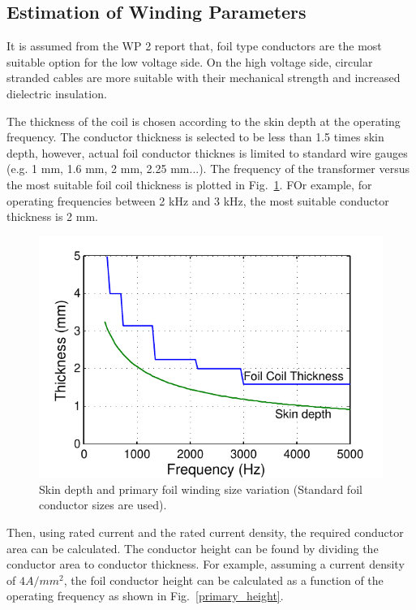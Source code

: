 \documentclass[a4paper, 11pt]{article} %
\begin{document}
\subsection{Estimation of Winding Parameters}

It is assumed from the WP 2 report that, foil type conductors are the most suitable option for the low voltage side. On the high voltage side, circular stranded cables are more suitable with their mechanical strength and increased dielectric insulation.

The thickness of the coil is chosen according to the skin depth at the operating frequency. The conductor thickness is selected to be less than 1.5 times skin depth, however, actual foil conductor thicknes is limited to standard wire gauges (e.g. 1 mm, 1.6 mm, 2 mm, 2.25 mm...). The frequency of the transformer versus the most suitable foil coil thickness is plotted in Fig.~\ref{primary_thickness}. FOr example, for operating frequencies between 2 kHz and 3 kHz, the most suitable conductor thickness is 2 mm.


\begin{figure}[]
  \centering
    \includegraphics[]{primary_thickness}
  \caption{Skin depth and primary foil winding size variation (Standard foil conductor sizes are used).}
  \label{primary_thickness}
\end{figure}


Then, using rated current and the rated current density, the required conductor area can be calculated. The conductor height can be found by dividing the conductor area to conductor thickness. For example, assuming a current density of $4 A/mm^2$, the foil conductor height can be calculated as a function of the operating frequency as shown in Fig.~\ref{primary_height}.
\end{document}
